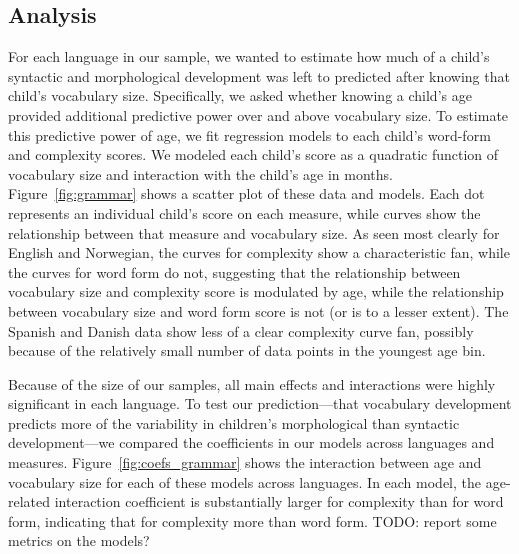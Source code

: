 \documentclass[10pt,letterpaper]{article}
\begin{document}
\subsection{Analysis}

For each language in our sample, we wanted to estimate how much of a child's syntactic and morphological development was left to predicted after knowing that child's vocabulary size. Specifically, we asked whether knowing a child's age provided additional predictive power over and above vocabulary size. To estimate this predictive power of age, we fit regression models to each child's word-form and complexity scores. We modeled each child's score as a quadratic function of vocabulary size and interaction with the child's age in months. Figure~\ref{fig:grammar} shows a scatter plot of these data and models. Each dot represents an individual child's score on each measure, while curves show the relationship between that measure and vocabulary size. As seen most clearly for English and Norwegian, the curves for complexity show a characteristic fan, while the curves for word form do not, suggesting that the relationship between vocabulary size and complexity score is modulated by age, while the relationship between vocabulary size and word form score is not (or is to a lesser extent). The Spanish and Danish data show less of a clear complexity curve fan, possibly because of the relatively small number of data points in the youngest age bin.

Because of the size of our samples, all main effects and interactions were highly significant in each language. To test our prediction---that vocabulary development predicts more of the variability in children's morphological than syntactic development---we compared the coefficients in our models across languages and measures. Figure~\ref{fig:coefs_grammar} shows the interaction between age and vocabulary size for each of these models across languages. In each model, the age-related interaction coefficient is substantially larger for complexity than for word form, indicating that for complexity more than word form. TODO: report some metrics on the models?
\end{document}
